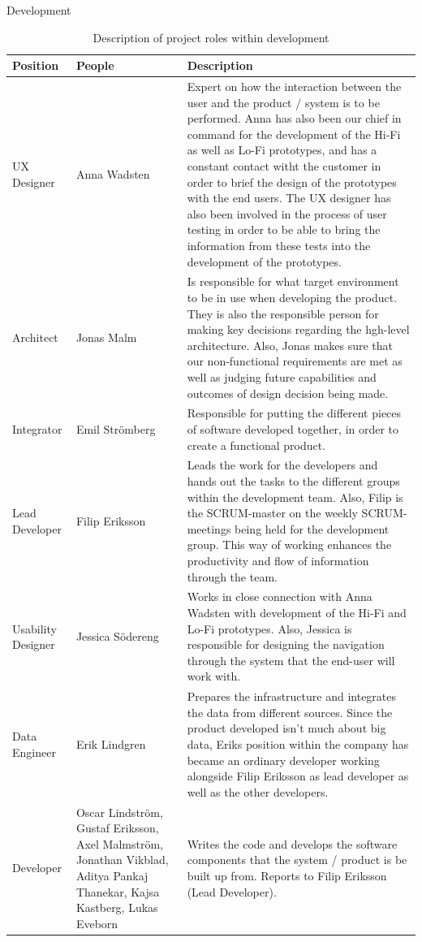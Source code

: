 \vspace{10cm}
\begin{table}[H]

\begin{center}
\begin{huge}
    Development
\end{huge}
\begin{tabular}{ | m{4cm} |m{3cm} |m{10cm}| } 
\hline
\textbf{Position} & \textbf{People} & \textbf{Description} \\ 
\hline
UX Designer & Anna Wadsten & Expert on how the interaction between the user and the product / system is to be performed. Anna has also been our chief in command for the development of the Hi-Fi as well as Lo-Fi prototypes, and has a constant contact witht the customer in order to brief the design of the prototypes with the end users. The UX designer has also been involved in the process of user testing in order to be able to bring the information from these tests into the development of the prototypes.  \\
\hline
Architect & Jonas Malm & Is responsible for what target environment to be in use when developing the product. They is also the responsible person for making key decisions regarding the hgh-level architecture. Also, Jonas makes sure that our non-functional requirements are met as well as judging future capabilities and outcomes of design decision being made.  \\
\hline
Integrator & Emil Strömberg & Responsible for putting the different pieces of software developed together, in order to create a functional product.  \\
\hline
Lead Developer & Filip Eriksson & Leads the work for the developers and hands out the tasks to the different groups within the development team. Also, Filip is the SCRUM-master on the weekly SCRUM-meetings being held for the development group. This way of working enhances the productivity and flow of information through the team. \\
\hline
Usability Designer & Jessica Södereng & Works in close connection with Anna Wadsten with development of the Hi-Fi and Lo-Fi prototypes. Also, Jessica is responsible for designing the navigation through the system that the end-user will work with. \\
\hline
Data Engineer & Erik Lindgren & Prepares the infrastructure and integrates the data from different sources. Since the product developed isn't much about big data, Eriks position within the company has became an ordinary developer working alongside Filip Eriksson as lead developer as well as the other developers. \\
\hline
Developer & Oscar Lindström, 
Gustaf Eriksson, 
Axel Malmström, Jonathan Vikblad, Aditya Pankaj Thanekar, Kajsa Kastberg, Lukas Eveborn   & Writes the code and develops the software components that the system / product is be built up from. Reports to Filip Eriksson (Lead Developer). \\
\hline
\end{tabular}

\end{center}
\caption{\label{tab:table-name}Description of project roles within development}

\end{table}
